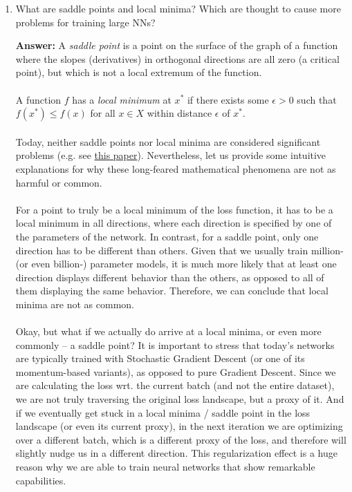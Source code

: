 \documentclass{article}
\newenvironment{QandA}{\begin{enumerate}[label=\arabic*.]}{\end{enumerate}}
\newenvironment{answer}{\par\normalfont \textbf{Answer:}}{}
\begin{document}
\begin{QandA}
    \item What are saddle points and local minima? Which are thought to cause more problems for training large NNs?
    \begin{answer}
        A \textit{saddle point} is a point on the surface of the graph of a function where the slopes (derivatives) in orthogonal directions are all zero (a critical point), but which is not a local extremum of the function. \\\\
        A function $f$ has a \textit{local minimum} at $x^*$ if there exists some $\epsilon > 0$ such that $f(x^*) \le f(x)$ for all $x \in X$ within distance $\epsilon$ of $x^*$. \\\\
        Today, neither saddle points nor local minima are considered significant problems (e.g. see \href{https://arxiv.org/abs/1412.6544}{this paper}). Nevertheless, let us provide some intuitive explanations for why these long-feared mathematical phenomena are not as harmful or common.\\\\
        For a point to truly be a local minimum of the loss function, it has to be a local minimum in all directions, where each direction is specified by one of the parameters of the network. In contrast, for a saddle point, only one direction has to be different than others. Given that we usually train million- (or even billion-) parameter models, it is much more likely that at least one direction displays different behavior than the others, as opposed to all of them displaying the same behavior. Therefore, we can conclude that local minima are not as common. \\\\
        Okay, but what if we actually do arrive at a local minima, or even more commonly -- a saddle point? It is important to stress that today's networks are typically trained with Stochastic Gradient Descent (or one of its momentum-based variants), as opposed to pure Gradient Descent. Since we are calculating the loss wrt. the current batch (and not the entire dataset), we are not truly traversing the original loss landscape, but a proxy of it. And if we eventually get stuck in a local minima / saddle point in the loss landscape (or even its current proxy), in the next iteration we are optimizing over a different batch, which is a different proxy of the loss, and therefore will slightly nudge us in a different direction. This regularization effect is a huge reason why we are able to train neural networks that show remarkable capabilities. 


\end{answer}
\end{QandA}
\end{document}
